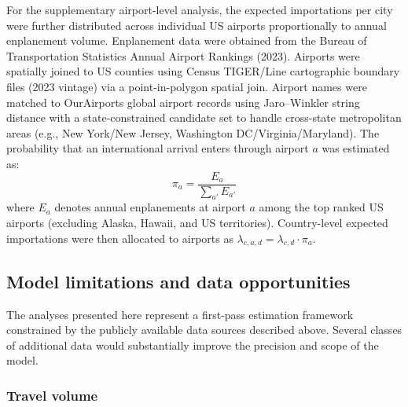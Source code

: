 \documentclass[12pt]{article}
\begin{document}
For the supplementary airport-level analysis, the expected
importations per city were further distributed across individual US
airports proportionally to annual enplanement volume. Enplanement
data were obtained from the Bureau of Transportation Statistics
Annual Airport Rankings (2023). Airports were spatially joined to US
counties using Census TIGER/Line cartographic boundary files (2023
vintage) via a point-in-polygon spatial join. Airport names were
matched to OurAirports global airport records using Jaro--Winkler
string distance with a state-constrained candidate set to handle
cross-state metropolitan areas (e.g., New York/New Jersey, Washington
DC/Virginia/Maryland). The probability that an international arrival
enters through airport $a$ was estimated as:
\begin{equation}
  \pi_a = \frac{E_a}{\sum_{a'} E_{a'}}
\end{equation}
where $E_a$ denotes annual enplanements at airport $a$ among the top
ranked US airports (excluding Alaska, Hawaii, and US territories).
Country-level expected importations were then allocated to airports
as $\lambda_{c,a,d} = \lambda_{c,d} \cdot \pi_a$.

\subsection*{Model limitations and data opportunities}

The analyses presented here represent a first-pass estimation framework
constrained by the publicly available data sources described above.
Several classes of additional data would substantially improve the
precision and scope of the model.

\subsubsection*{Travel volume}
\end{document}
